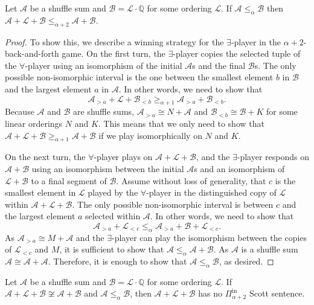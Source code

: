 \documentclass[10pt,a4paper]{amsart}
\providecommand{\A}{\mathcal{A}}
\providecommand{\L}{\mathcal{L}}
\providecommand{\B}{\mathcal{B}}
\providecommand{\Pinf}[1]{\Pi^{\mathrm{in}}_{#1}}
\newcommand{\Q}{\mathbb{Q}}
\renewcommand{\L}{\mathcal{L}}
\begin{document}
\begin{lemma}\label{lem:shufflesum}
Let $\A$ be a shuffle sum and $\B = \L\cdot\Q$ for some ordering $\L$. If
$\A\leq_\alpha \B$ then $\A+\L+\B\leq_{\alpha+2}\A+\B$.
\end{lemma}
\begin{proof}
To show this, we describe a winning strategy for the $\exists$-player in the
$\alpha+2$-back-and-forth game. 
On the first turn, the $\exists$-player copies the selected tuple of the
$\forall$-player using an isomorphism of the initial $\A$s and the final $\B$s. 
The only possible non-isomorphic interval is the one between the smallest
element $b$ in $\B$ and the largest element $a$ in $\A$. 
In other words, we need to show that 
\[\A_{>a}+\L+\B_{<b}\geq_{\alpha+1} \A_{>a}+\B_{<b}.\]
Because $\A$ and $\B$ are shuffle sums, $\A_{>a}\cong N+\A$ and $\B_{<b}\cong
\B+K$ for some linear orderings $N$ and $K$. 
This means that we only need to show that
$\A+\L+\B\geq_{\alpha+1}\A+\B$
if we play isomorphically on $N$ and $K$.

On the next turn, the $\forall$-player plays on $\A+\L+\B$, and the
$\exists$-player responds on $\A+\B$ using an isomorphism between the initial
$\A$s and an isomorphism of $\L+\B$ to a final segment of $\B$.
Assume without loss of generality, that $c$ is the smallest element in $\L$
played by the $\forall$-player in the distinguished copy of $\L$ within $\A+\L+\B$.
The only possible non-isomorphic interval is between $c$ and the
largest element $a$ selected within $\A$.
In other words, we need to show that 
\[\A_{>a}+\L_{<c}\leq_{\alpha} \A_{>a}+\B+\L_{<c}.\]
As $\A_{>a}\cong M+\A$ and the $\exists$-player can play the isomorphism between
the copies of $\L_{<c}$ and $M$, it is sufficient to show that $\A\leq_{\alpha}\A+\B$.
As $\A$ is a shuffle sum $\A\cong \A+\A$.
Therefore, it is enough to show that $\A\leq_\alpha \B$, as desired.
\end{proof}

\begin{corollary}\label{lower}
Let $\A$ be a shuffle sum and $\B = \L\cdot\Q$ for some ordering $\L$. If $\A+\L+\B\not\cong \A+\B$ and
$\A\leq_\alpha \B$, then $\A+\L+\B$ has no $\Pinf{\alpha+2}$ Scott sentence.
\end{corollary}
\end{document}
